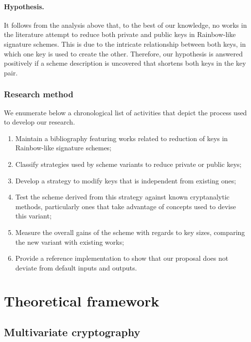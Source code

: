 \documentclass[openright]{report}
\begin{document}

\subsubsection{Hypothesis.} It follows from the analysis above that, to the best of our knowledge, no works in the literature attempt to reduce both private and public keys in Rainbow-like signature schemes. This is due to the intricate relationship between both keys, in which one key is used to create the other. Therefore, our hypothesis is answered positively if a scheme description is uncovered that shortens both keys in the key pair.

\subsection{Research method}

We enumerate below a chronological list of activities that depict the process used to develop our research.

\begin{enumerate}[label=(\roman*), itemsep=1pt]
    \item Maintain a bibliography featuring works related to reduction of keys in Rainbow-like signature schemes;
    \item Classify strategies used by scheme variants to reduce private or public keys;
    \item Develop a strategy to modify keys that is independent from existing ones;
    \item Test the scheme derived from this strategy against known cryptanalytic methods, particularly ones that take advantage of concepts used to devise this variant;
    \item Measure the overall gains of the scheme with regards to key sizes, comparing the new variant with existing works;
    \item Provide a reference implementation to show that our proposal does not deviate from default inputs and outputs.
\end{enumerate}

\chapter{Theoretical framework}

\section{Multivariate cryptography}
\end{document}
